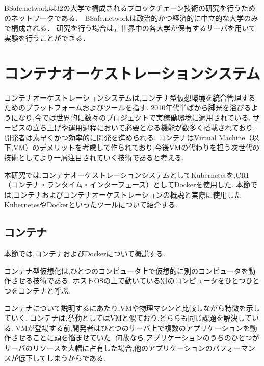 BSafe.networkは32の大学で構成されるブロックチェーン技術の研究を行うためのネットワークである．
BSafe.networkは政治的かつ経済的に中立的な大学のみで構成される．
研究を行う場合は，世界中の各大学が保有するサーバを用いて実験を行うことができる．

\section{コンテナオーケストレーションシステム}
\label{background:container-orchestration-system}

コンテナオーケストレーションシステムは,コンテナ型仮想環境を統合管理するためのプラットフォームおよびツールを指す.
2010年代半ばから脚光を浴びるようになり,今では世界的に数々のプロジェクトで実稼働環境に適用されている.
サービスの立ち上げや運用過程において必要となる機能が数多く搭載されており,開発者は素早くかつ効率的に開発を進められる.
コンテナはVirtual Machine（以下,VM）のデメリットを考慮して作られており,今後VMの代わりを担う次世代の技術としてより一層注目されていく技術であると考える.

本研究では,コンテナオーケストレーションシステムとしてKubernetesを,CRI（コンテナ・ランタイム・インターフェース）としてDockerを使用した.
本節では,コンテナおよびコンテナオーケストレーションの概説と実際に使用したKubernetesやDockerといったツールについて紹介する.

\subsection{コンテナ}
\label{background:container-orchestration-system:container}

本節では,コンテナおよびDockerについて概説する.

コンテナ型仮想化は,ひとつのコンピュータ上で仮想的に別のコンピュータを動作させる技術である.
ホストOSの上で動いている別のコンピュータをひとつひとつをコンテナと呼ぶ.

コンテナについて説明するにあたり,VMや物理マシンと比較しながら特徴を示していく.
コンテナは,挙動としてはVMと似ており,どちらも同じ課題を解決している.
VMが登場する前,開発者はひとつのサーバ上で複数のアプリケーションを動作させることに頭を悩ませていた.
何故なら,アプリケーションのうちのひとつがサーバのリソースを大幅に占有した場合,他のアプリケーションのパフォーマンスが低下してしまうからである.

